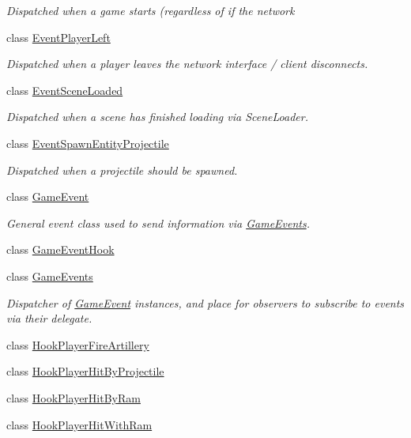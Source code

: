 \begin{DoxyCompactItemize}
\begin{DoxyCompactList}\small\item\em Dispatched when a game starts (regardless of if the network \end{DoxyCompactList}\item 
class \hyperlink{class_skyrates_1_1_game_1_1_event_1_1_event_player_left}{Event\-Player\-Left}
\begin{DoxyCompactList}\small\item\em Dispatched when a player leaves the network interface / client disconnects. \end{DoxyCompactList}\item 
class \hyperlink{class_skyrates_1_1_game_1_1_event_1_1_event_scene_loaded}{Event\-Scene\-Loaded}
\begin{DoxyCompactList}\small\item\em Dispatched when a scene has finished loading via Scene\-Loader. \end{DoxyCompactList}\item 
class \hyperlink{class_skyrates_1_1_game_1_1_event_1_1_event_spawn_entity_projectile}{Event\-Spawn\-Entity\-Projectile}
\begin{DoxyCompactList}\small\item\em Dispatched when a projectile should be spawned. \end{DoxyCompactList}\item 
class \hyperlink{class_skyrates_1_1_game_1_1_event_1_1_game_event}{Game\-Event}
\begin{DoxyCompactList}\small\item\em General event class used to send information via \hyperlink{class_skyrates_1_1_game_1_1_event_1_1_game_events}{Game\-Events}. \end{DoxyCompactList}\item 
class \hyperlink{class_skyrates_1_1_game_1_1_event_1_1_game_event_hook}{Game\-Event\-Hook}
\item 
class \hyperlink{class_skyrates_1_1_game_1_1_event_1_1_game_events}{Game\-Events}
\begin{DoxyCompactList}\small\item\em Dispatcher of \hyperlink{class_skyrates_1_1_game_1_1_event_1_1_game_event}{Game\-Event} instances, and place for observers to subscribe to events via their delegate. \end{DoxyCompactList}\item 
class \hyperlink{class_skyrates_1_1_game_1_1_event_1_1_hook_player_fire_artillery}{Hook\-Player\-Fire\-Artillery}
\item 
class \hyperlink{class_skyrates_1_1_game_1_1_event_1_1_hook_player_hit_by_projectile}{Hook\-Player\-Hit\-By\-Projectile}
\item 
class \hyperlink{class_skyrates_1_1_game_1_1_event_1_1_hook_player_hit_by_ram}{Hook\-Player\-Hit\-By\-Ram}
\item 
class \hyperlink{class_skyrates_1_1_game_1_1_event_1_1_hook_player_hit_with_ram}{Hook\-Player\-Hit\-With\-Ram}
\end{DoxyCompactItemize}
